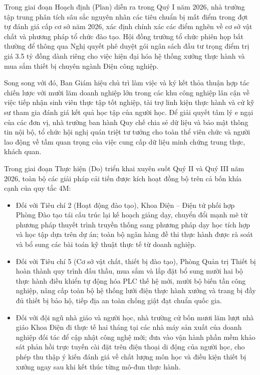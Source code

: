 Trong giai đoạn Hoạch định (Plan) diễn ra trong Quý I năm 2026, nhà trường tập trung phân tích sâu sắc nguyên nhân các tiêu chuẩn bị mất điểm trong đợt tự đánh giá cấp cơ sở năm 2026, xác định chính xác các điểm nghẽn về cơ sở vật chất và phương pháp tổ chức đào tạo. Hội đồng trường tổ chức phiên họp bất thường để thông qua Nghị quyết phê duyệt gói ngân sách đầu tư trọng điểm trị giá 3.5 tỷ đồng dành riêng cho việc hiện đại hóa hệ thống xưởng thực hành và mua sắm thiết bị chuyên ngành Điện công nghiệp. 

Song song với đó, Ban Giám hiệu chủ trì làm việc và ký kết thỏa thuận hợp tác chiến lược với mười lăm doanh nghiệp lớn trong các khu công nghiệp lân cận về việc tiếp nhận sinh viên thực tập tốt nghiệp, tài trợ linh kiện thực hành và cử kỹ sư tham gia đánh giá kết quả học tập của người học. Để giải quyết tâm lý e ngại của các đơn vị, nhà trường ban hành Quy chế chia sẻ dữ liệu và bảo mật thông tin nội bộ, tổ chức hội nghị quán triệt tư tưởng cho toàn thể viên chức và người lao động về tầm quan trọng của việc cung cấp dữ liệu minh chứng trung thực, khách quan.

Trong giai đoạn Thực hiện (Do) triển khai xuyên suốt Quý II và Quý III năm 2026, toàn bộ các giải pháp cải tiến được kích hoạt đồng bộ trên cả bốn khía cạnh của quy tắc 4M:
\begin{itemize}
    \item Đối với Tiêu chí 2 (Hoạt động đào tạo), Khoa Điện -- Điện tử phối hợp Phòng Đào tạo tái cấu trúc lại kế hoạch giảng dạy, chuyển đổi mạnh mẽ từ phương pháp thuyết trình truyền thống sang phương pháp dạy học tích hợp và học tập dựa trên dự án; toàn bộ ngân hàng đề thi thực hành được rà soát và bổ sung các bài toán kỹ thuật thực tế từ doanh nghiệp.
    \item Đối với Tiêu chí 5 (Cơ sở vật chất, thiết bị đào tạo), Phòng Quản trị Thiết bị hoàn thành quy trình đấu thầu, mua sắm và lắp đặt bổ sung mười hai bộ thực hành điều khiển tự động hóa PLC thế hệ mới, mười bộ biến tần công nghiệp, nâng cấp toàn bộ hệ thống lưới điện thực hành xưởng và trang bị đầy đủ thiết bị bảo hộ, tiếp địa an toàn chống giật đạt chuẩn quốc gia.
    \item Đối với đội ngũ nhà giáo và người học, nhà trường cử bốn mươi lăm lượt nhà giáo Khoa Điện đi thực tế hai tháng tại các nhà máy sản xuất của doanh nghiệp đối tác để cập nhật công nghệ mới; đưa vào vận hành phần mềm khảo sát phản hồi trực tuyến cài đặt trên điện thoại di động của người học, cho phép thu thập ý kiến đánh giá về chất lượng môn học và điều kiện thiết bị xưởng ngay sau khi kết thúc từng mô-đun thực hành.
\end{itemize}

